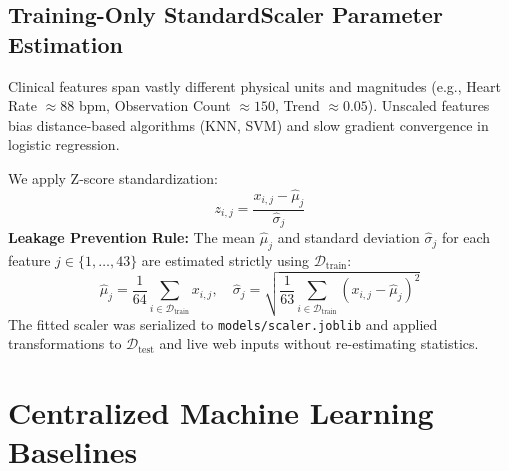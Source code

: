 \documentclass[12pt,a4paper,oneside]{report}
\begin{document}
\subsection{Training-Only StandardScaler Parameter Estimation}
\label{subsec:feature_scaling}

Clinical features span vastly different physical units and magnitudes (e.g., Heart Rate $\approx 88$ bpm, Observation Count $\approx 150$, Trend $\approx 0.05$). Unscaled features bias distance-based algorithms (KNN, SVM) and slow gradient convergence in logistic regression.

We apply Z-score standardization:
\begin{equation}
z_{i, j} = \frac{x_{i, j} - \hat{\mu}_j}{\hat{\sigma}_j}
\end{equation}
\textbf{Leakage Prevention Rule:} The mean $\hat{\mu}_j$ and standard deviation $\hat{\sigma}_j$ for each feature $j \in \{1, \dots, 43\}$ are estimated strictly using $\mathcal{D}_{\text{train}}$:
\begin{equation}
\hat{\mu}_j = \frac{1}{64} \sum_{i \in \mathcal{D}_{\text{train}}} x_{i, j}, \quad \hat{\sigma}_j = \sqrt{\frac{1}{63} \sum_{i \in \mathcal{D}_{\text{train}}} (x_{i, j} - \hat{\mu}_j)^2}
\end{equation}
The fitted scaler was serialized to \texttt{models/scaler.joblib} and applied transformations to $\mathcal{D}_{\text{test}}$ and live web inputs without re-estimating statistics.

\section{Centralized Machine Learning Baselines}
\label{sec:centralized_models}
\end{document}
